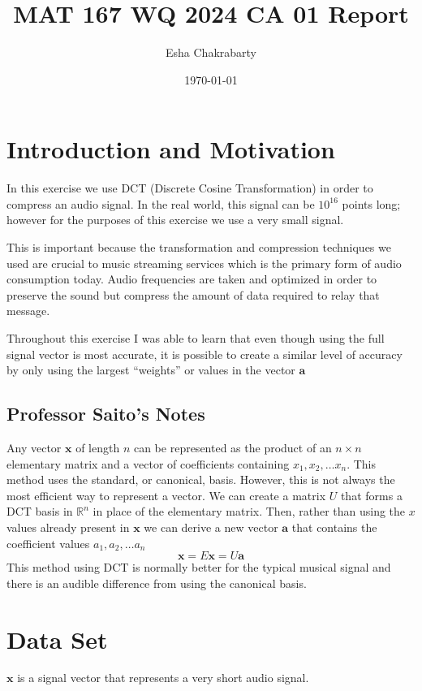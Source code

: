 \documentclass{article}
\title{MAT 167 WQ 2024 CA 01 Report}
\author{Esha Chakrabarty}
\date{\today}
\newcommand{\bs}[1]{\boldsymbol{#1}}
\begin{document}
\maketitle
\tableofcontents
\newpage

\section{Introduction and Motivation}

In this exercise we use DCT (Discrete Cosine Transformation) in order to compress an audio signal. In the real world, this signal can be $10^16$ points long; however for the purposes of this exercise we use a very small signal.  

This is important because the transformation and compression techniques we used are crucial to music streaming services which is the primary form of audio consumption today. Audio frequencies are taken and optimized in order to preserve the sound but compress the amount of data required to relay that message.

Throughout this exercise I was able to learn that even though using the full signal vector is most accurate, it is possible to create a similar level of accuracy by only using the largest “weights” or values in the vector $\bs{a}$

\subsection{Professor Saito's Notes}

Any vector $\bs{x}$ of length $n$ can be represented as the product of an $n \times n$ elementary matrix and a vector of coefficients containing {$x_1, x_2, … x_n$}. This method uses the standard, or canonical, basis. However, this is not always the most efficient way to represent a vector. We can create a matrix $U$ that forms a DCT basis in $\mathbb{R}^n$ in place of the elementary matrix. Then, rather than using the $x$ values already present in $\bs{x}$ we can derive a new vector $\bs{a}$ that contains the coefficient values $a_1, a_2, … a_n$
$$\bs{x} =E\bs{x} = U\bs{a}$$
This method using DCT is normally better for the typical musical signal and there is an audible difference from using the canonical basis.

\section{Data Set}

$\bs{x}$ is a signal vector that represents a very short audio signal. 
\end{document}
